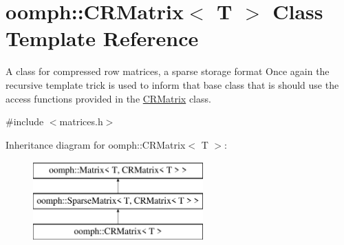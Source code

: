 \hypertarget{classoomph_1_1CRMatrix}{}\section{oomph\+:\+:C\+R\+Matrix$<$ T $>$ Class Template Reference}
\label{classoomph_1_1CRMatrix}


A class for compressed row matrices, a sparse storage format Once again the recursive template trick is used to inform that base class that is should use the access functions provided in the \hyperlink{classoomph_1_1CRMatrix}{C\+R\+Matrix} class.  




{\ttfamily \#include $<$matrices.\+h$>$}

Inheritance diagram for oomph\+:\+:C\+R\+Matrix$<$ T $>$\+:\begin{figure}[H]
\begin{center}
\leavevmode
\includegraphics[height=3.000000cm]{classoomph_1_1CRMatrix}
\end{center}
\end{figure}
